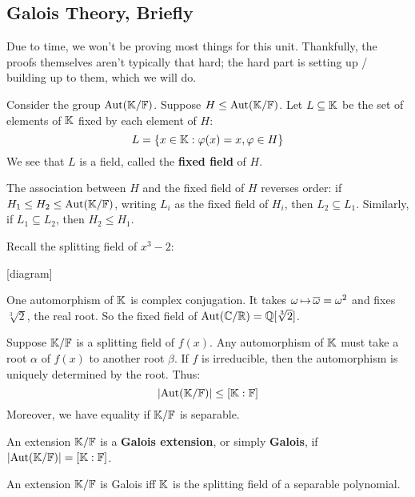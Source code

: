 \subsection{Galois Theory, Briefly}

Due to time, we won't be proving most things for this unit.
Thankfully, the proofs themselves aren't typically that hard;
the hard part is setting up / building up to them, which we will do.

Consider the group $ \operatorname{Aut}(\mathbb{K}/\mathbb{F}) $.
Suppose $ H \leq \operatorname{Aut}(\mathbb{K}/\mathbb{F}) $. Let $ L \subseteq \mathbb{K} $ be the set of elements
of $ \mathbb{K} $ fixed by each element of $ H $:
\begin{equation*}
    L = \left\{{x \in \mathbb{K}: \operatorname{\varphi}(x) = x, \operatorname{\varphi} \in H}\right\}
\end{equation*}
We see that $ L $ is a field, called the \textbf{fixed field} of $ H $.

The association between $ H $ and the fixed field of $ H $ reverses order:
if $ H_{1} \leq H_{2} \leq \operatorname{Aut}(\mathbb{K}/\mathbb{F}) $, writing $ L_{i} $ as the fixed field
of $ H_{i} $, then $ L_{2} \subseteq L_{1} $. Similarly, if $ L_{1} \subseteq
L_{2} $, then $ H_{2} \leq H_{1} $.

\begin{xmp}[source=Primary Source Material]
    Recall the splitting field of $ x^{3}-2 $:

    [diagram]

    One automorphism of $ \mathbb{K} $ is complex conjugation.
    It takes $ \omega \operatorname{\mapsto} \overline{\omega} = \omega^{2} $ and fixes $ \sqrt[3]{2} $,
    the real root. So the fixed field of $ \operatorname{Aut}(\mathbb{C}/\mathbb{R}) = \mathbb{Q}[\sqrt[3]{2}] $.
\end{xmp}

Suppose $ \mathbb{K}/\mathbb{F} $ is a splitting field of $ f(x) $.
Any automorphism of $ \mathbb{K} $ must take a root $ \alpha $ of $ f(x) $ to another
root $ \beta $. If $ f $ is irreducible, then the automorphism is uniquely
determined by the root. Thus:
\begin{equation*}
    \abs{\operatorname{Aut}(\mathbb{K}/\mathbb{F})} \leq [\mathbb{K}:\mathbb{F}]
\end{equation*}
Moreover, we have equality if $ \mathbb{K}/\mathbb{F} $ is separable.

\begin{defn}
    An extension $ \mathbb{K}/\mathbb{F} $ is a \textbf{Galois extension}, or simply
    \textbf{Galois}, if $ \abs{\operatorname{Aut}(\mathbb{K}/\mathbb{F})} = [\mathbb{K}:\mathbb{F}] $.
\end{defn}

\begin{thm}
    An extension $ \mathbb{K}/\mathbb{F} $ is Galois iff $ \mathbb{K} $ is the splitting field of a
    separable polynomial.
\end{thm}

